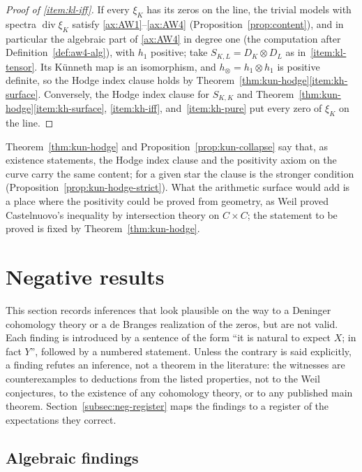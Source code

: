 \documentclass[11pt]{amsart}
\theoremstyle{plain}
\theoremstyle{definition}
\theoremstyle{remark}
\numberwithin{equation}{section}
\DeclareMathOperator{\divisor}{div}
\begin{document}
\begin{proof}[Proof of \ref{item:kl-iff}]
If every $\xi_K$ has its zeros on the line, the trivial models with
spectra $\divisor\xi_K$ satisfy \ref{ax:AW1}--\ref{ax:AW4}
(Proposition~\ref{prop:content}), and in particular the algebraic part
of \ref{ax:AW4} in degree one (the computation after
Definition~\ref{def:aw4-alg}), with $h_1$ positive; take
$S_{K,L}=D_K\otimes D_L$ as in~\ref{item:kl-tensor}. Its K\"unneth map
is an isomorphism, and $h_\otimes=h_1\otimes h_1$ is positive definite,
so the Hodge index clause holds by
Theorem~\ref{thm:kun-hodge}\ref{item:kh-surface}. Conversely, the Hodge
index clause for $S_{K,K}$ and
Theorem~\ref{thm:kun-hodge}\ref{item:kh-surface}, \ref{item:kh-iff},
and~\ref{item:kh-pure} put every zero of $\xi_K$ on the line.
\end{proof}

Theorem~\ref{thm:kun-hodge} and Proposition~\ref{prop:kun-collapse} say
that, as existence statements, the Hodge index clause and the
positivity axiom on the curve carry the same content; for a given star
the clause is the stronger condition
(Proposition~\ref{prop:kun-hodge-strict}). What the arithmetic surface
would add is a place
where the positivity could be proved from geometry, as Weil proved
Castelnuovo's inequality by intersection theory on $C\times C$; the
statement to be proved is fixed by Theorem~\ref{thm:kun-hodge}.
\section{Negative results}\label{sec:negative}

This section records inferences that look plausible on the way to a
Deninger cohomology theory or a de Branges realization of the zeros,
but are not valid. Each finding is introduced by a sentence of the form
``it is natural to expect $X$; in fact $Y$'', followed by a numbered
statement. Unless the contrary is said explicitly, a finding refutes an
inference, not a theorem in the literature: the witnesses are
counterexamples to deductions from the listed properties, not to the
Weil conjectures, to the existence of any cohomology theory, or to any
published main theorem. Section~\ref{subsec:neg-register} maps the
findings to a register of the expectations they correct.

\subsection{Algebraic findings}\label{subsec:neg-algebraic}
\end{document}
